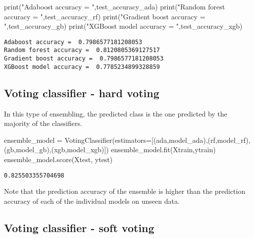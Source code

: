 \documentclass[
  letterpaper,
  DIV=11,
  numbers=noendperiod]{scrreprt}
\newenvironment{Shaded}{\begin{snugshade}}{\end{snugshade}}
\newcommand{\BuiltInTok}[1]{\textcolor[rgb]{0.00,0.23,0.31}{#1}}
\newcommand{\NormalTok}[1]{\textcolor[rgb]{0.00,0.23,0.31}{#1}}
\newcommand{\OperatorTok}[1]{\textcolor[rgb]{0.37,0.37,0.37}{#1}}
\newcommand{\StringTok}[1]{\textcolor[rgb]{0.13,0.47,0.30}{#1}}
\begin{document}
\begin{Shaded}
\begin{Highlighting}[]
\BuiltInTok{print}\NormalTok{(}\StringTok{"Adaboost accuracy = "}\NormalTok{,test\_accuracy\_ada)}
\BuiltInTok{print}\NormalTok{(}\StringTok{"Random forest accuracy = "}\NormalTok{,test\_accuracy\_rf)}
\BuiltInTok{print}\NormalTok{(}\StringTok{"Gradient boost accuracy = "}\NormalTok{,test\_accuracy\_gb)}
\BuiltInTok{print}\NormalTok{(}\StringTok{"XGBoost model accuracy = "}\NormalTok{,test\_accuracy\_xgb)}
\end{Highlighting}
\end{Shaded}

\begin{verbatim}
Adaboost accuracy =  0.7986577181208053
Random forest accuracy =  0.8120805369127517
Gradient boost accuracy =  0.7986577181208053
XGBoost model accuracy =  0.7785234899328859
\end{verbatim}

\subsection{Voting classifier - hard
voting}\label{voting-classifier---hard-voting}

In this type of ensembling, the predicted class is the one predicted by
the majority of the classifiers.

\begin{Shaded}
\begin{Highlighting}[]
\NormalTok{ensemble\_model }\OperatorTok{=}\NormalTok{ VotingClassifier(estimators}\OperatorTok{=}\NormalTok{[(}\StringTok{\textquotesingle{}ada\textquotesingle{}}\NormalTok{,model\_ada),(}\StringTok{\textquotesingle{}rf\textquotesingle{}}\NormalTok{,model\_rf),(}\StringTok{\textquotesingle{}gb\textquotesingle{}}\NormalTok{,model\_gb),(}\StringTok{\textquotesingle{}xgb\textquotesingle{}}\NormalTok{,model\_xgb)])}
\NormalTok{ensemble\_model.fit(Xtrain,ytrain)}
\NormalTok{ensemble\_model.score(Xtest, ytest)}
\end{Highlighting}
\end{Shaded}

\begin{verbatim}
0.825503355704698
\end{verbatim}

Note that the prediction accuracy of the ensemble is higher than the
prediction accuracy of each of the individual models on unseen data.

\subsection{Voting classifier - soft
voting}\label{voting-classifier---soft-voting}
\end{document}

